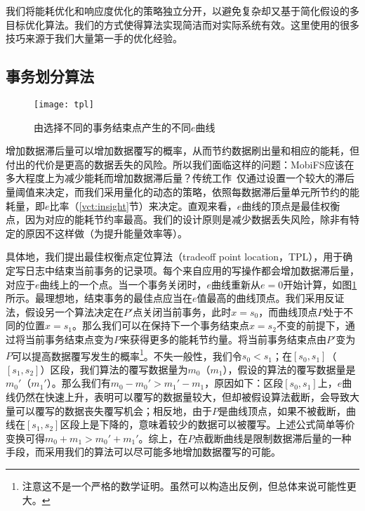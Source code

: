 我们将能耗优化和响应度优化的策略独立分开，以避免复杂却又基于简化假设的多目标优化算法。我们的方式使得算法实现简洁而对实际系统有效。这里使用的很多技巧来源于我们大量第一手的优化经验。 

\subsection{事务划分算法}
\label{vct:point}

\begin{figure}
\centering
\texttt{[image: tpl]}
\caption{由选择不同的事务结束点产生的不同$e$曲线}
\label{fig:tpl}
\end{figure}

增加数据滞后量可以增加数据覆写的概率，从而节约数据刷出量和相应的能耗，但付出的代价是更高的数据丢失的风险。所以我们面临这样的问题：MobiFS应该在多大程度上为减少能耗而增加数据滞后量？传统工作~\cite{Ma:2011:LPF:1989323.1989325, Mickens:2014:BFC:2616448.2616473, Ports:2010:TCA:1924943.1924963}仅通过设置一个较大的滞后量阈值来决定，而我们采用量化的动态的策略，依照每数据滞后量单元所节约的能耗量，即$e$比率（\ref{vct:insight}节）来决定。直观来看，$e$曲线的顶点是最佳权衡点，因为对应的能耗节约率最高。我们的设计原则是减少数据丢失风险，除非有特定的原因不这样做（为提升能量效率等）。 

具体地，我们提出最佳权衡点定位算法（tradeoff point location，TPL），用于确定写日志中结束当前事务的记录项。每个来自应用的写操作都会增加数据滞后量，对应于$e$曲线上的一个点。当一个事务关闭时，$e$曲线重新从$e=0$开始计算，如图\ref{fig:tpl}所示。最理想地，结束事务的最佳点应当在$e$值最高的曲线顶点。我们采用反证法，假设另一个算法决定在$P'$点关闭当前事务，此时$x = s_0$，而曲线顶点$P$处于不同的位置$x = s_1$。那么我们可以在保持下一个事务结束点$x = s_2$不变的前提下，通过将当前事务结束点变为$P$来获得更多的能耗节约量。将当前事务结束点由$P'$变为$P$可以提高数据覆写发生的概率\footnote{注意这不是一个严格的数学证明。虽然可以构造出反例，但总体来说可能性更大。}。不失一般性，我们令$s_0 < s_1$；在$[s_0, s_1]$（$[s_1, s_2]$）区段，我们算法的覆写数据量为$m_0$（$m_1$），假设的算法的覆写数据量是$m_0'$（$m_1'$）。那么我们有$m_0 - m_0' > m_1' -
m_1$，原因如下：区段$[s_0, s_1]$上，$e$曲线仍然在快速上升，表明可以覆写的数据量较大，但却被假设算法截断，会导致大量可以覆写的数据丧失覆写机会；相反地，由于$P$是曲线顶点，如果不被截断，曲线在$[s_1, s_2]$区段上是下降的，意味着较少的数据可以被覆写。上述公式简单等价变换可得$m_0 + m_1 > m_0' + m_1'$。综上，在$P$点截断曲线是限制数据滞后量的一种手段，而采用我们的算法可以尽可能多地增加数据覆写的可能。
 
